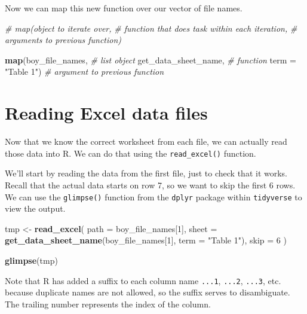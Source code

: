 \documentclass[]{book}
\newenvironment{Shaded}{\begin{snugshade}}{\end{snugshade}}
\newcommand{\CommentTok}[1]{\textcolor[rgb]{0.56,0.35,0.01}{\textit{#1}}}
\newcommand{\DataTypeTok}[1]{\textcolor[rgb]{0.13,0.29,0.53}{#1}}
\newcommand{\DecValTok}[1]{\textcolor[rgb]{0.00,0.00,0.81}{#1}}
\newcommand{\KeywordTok}[1]{\textcolor[rgb]{0.13,0.29,0.53}{\textbf{#1}}}
\newcommand{\NormalTok}[1]{#1}
\newcommand{\StringTok}[1]{\textcolor[rgb]{0.31,0.60,0.02}{#1}}
\begin{document}
Now we can map this new function over our vector of file names.

\begin{Shaded}
\begin{Highlighting}[]
\CommentTok{# map(object to iterate over, }
\CommentTok{#     function that does task within each iteration, }
\CommentTok{#     arguments to previous function)}
 
\KeywordTok{map}\NormalTok{(boy_file_names,      }\CommentTok{# list object}
\NormalTok{    get_data_sheet_name, }\CommentTok{# function}
    \DataTypeTok{term =} \StringTok{"Table 1"}\NormalTok{)    }\CommentTok{# argument to previous function}
\end{Highlighting}
\end{Shaded}

\hypertarget{reading-excel-data-files}{%
\section{Reading Excel data files}\label{reading-excel-data-files}}

Now that we know the correct worksheet from each file, we can actually
read those data into R. We can do that using the \texttt{read\_excel()} function.

We'll start by reading the data from the first file, just to check
that it works. Recall that the actual data starts on row 7, so we want
to skip the first 6 rows. We can use the \texttt{glimpse()} function from
the \texttt{dplyr} package within \texttt{tidyverse} to view the output.

\begin{Shaded}
\begin{Highlighting}[]
\NormalTok{tmp <-}\StringTok{ }\KeywordTok{read_excel}\NormalTok{(}
  \DataTypeTok{path =}\NormalTok{ boy_file_names[}\DecValTok{1}\NormalTok{],}
  \DataTypeTok{sheet =} \KeywordTok{get_data_sheet_name}\NormalTok{(boy_file_names[}\DecValTok{1}\NormalTok{], }\DataTypeTok{term =} \StringTok{"Table 1"}\NormalTok{),}
  \DataTypeTok{skip =} \DecValTok{6}
\NormalTok{)}

\KeywordTok{glimpse}\NormalTok{(tmp)}
\end{Highlighting}
\end{Shaded}

Note that R has added a suffix to each column name \texttt{...1}, \texttt{...2},
\texttt{...3}, etc. because duplicate names are not allowed, so the suffix serves
to disambiguate. The trailing number represents the index of the column.
\end{document}
